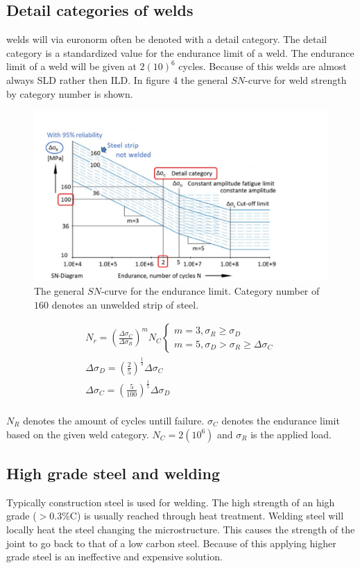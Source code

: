 \documentclass[11pt, a4paper]{article}
\begin{document}
\subsection{Detail categories of welds}
welds will via euronorm often be denoted with a detail category. The detail category is a standardized value for the endurance limit of a weld. The endurance limit of a weld will be given at $2(10)^6$ cycles. Because of this welds are almost always SLD rather then ILD. In figure 4 the general $SN$-curve for weld strength by category number is shown.

\begin{figure}[H]
  \centerline{\includegraphics[width=120mm]{images/SN_curve.png}}
  \caption{The general $SN$-curve for the endurance limit. Category number of $160$ denotes an unwelded strip of steel.}
\end{figure}

\begin{gather}
	N_r = \left( \frac{\Delta \sigma_C}{\Delta \sigma_R} \right)^m N_C
	\begin{cases}
		m = 3, \sigma_R \geq \sigma_D\\
		m = 5, \sigma_D > \sigma_R \geq \Delta \sigma_C
	\end{cases}\\
	\Delta \sigma_D = \left( \frac{2}{5} \right)^{\frac{1}{3}} \Delta \sigma_C\\
	\Delta \sigma_C = \left( \frac{5}{100} \right)^{\frac{1}{5}} \Delta \sigma_D\\
\end{gather}

$N_R$ denotes the amount of cycles untill failure. $\sigma_C$ denotes the endurance limit based on the given weld category. $N_C = 2(10^6)$ and $\sigma_R$ is the applied load.



\subsection{High grade steel and welding}
Typically construction steel is used for welding. The high strength of an high grade ($>0.3\%$C) is usually reached through heat treatment. Welding steel will locally heat the steel changing the microstructure. This causes the strength of the joint to go back to that of a low carbon steel. Because of this applying higher grade steel is an ineffective and expensive solution.
\end{document}
